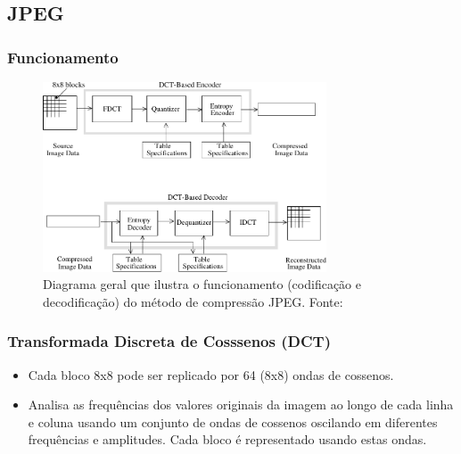 \documentclass{beamer}
\begin{document}
\subsection{JPEG}
\begin{frame}
\frametitle{Funcionamento}
\begin{figure}
\includegraphics[width=0.75\textwidth]{figs/jpeg.pdf}
\caption{Diagrama geral que ilustra o funcionamento (codificação e decodificação) do método de compressão JPEG. Fonte:~\cite{jpeg}}
\end{figure} 
\end{frame}
\begin{frame}
\frametitle{Transformada Discreta de Cosssenos (DCT)}
\begin{itemize}
\item Cada bloco 8x8 pode ser replicado por 64 (8x8) ondas de cossenos.
\item Analisa as frequências dos valores originais da imagem ao longo de cada linha e coluna usando um conjunto de ondas de cossenos oscilando em diferentes frequências e amplitudes. Cada bloco é representado usando estas ondas.
\end{itemize} 
\end{frame}
\end{document}

